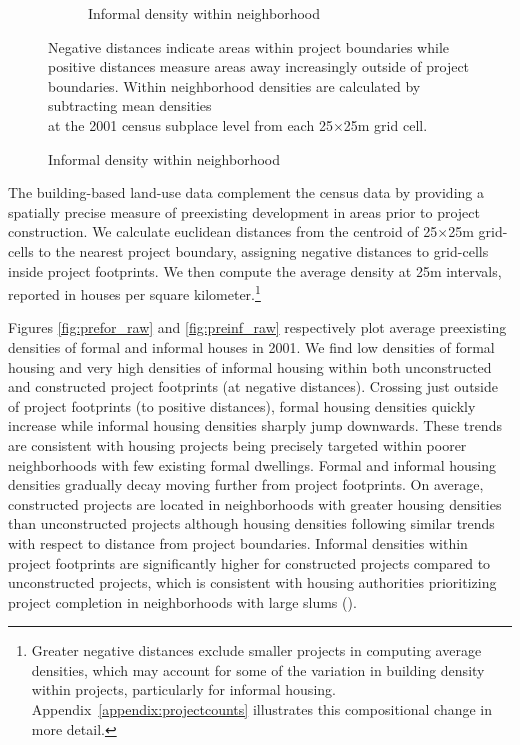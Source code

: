\documentclass[12pt]{article}
\begin{document}
\begin{figure}[h!]
\begin{subfigure}[b]{0.495\textwidth}
            \caption[]%
            {{\small Informal density within neighborhood}}    
            \label{fig:preinf_fe}
        \end{subfigure}
        \label{fig:rawbblumeans_het}
   {\scriptsize Negative distances indicate areas within project boundaries while positive distances measure areas away increasingly outside of project boundaries.  Within neighborhood densities are calculated by subtracting mean densities  \\[-.5em] at the 2001 census subplace level from each 25$\times$25m grid cell.}
    \end{figure} 


The building-based land-use data complement the census data by providing a spatially precise measure of preexisting development in areas prior to project construction.  We calculate euclidean distances from the centroid of 25$\times$25m grid-cells to the nearest project boundary, assigning negative distances to grid-cells inside project footprints.  We then compute the average density at 25m intervals, reported in houses per square kilometer.\footnote{Greater negative distances exclude smaller projects in computing average densities, which may account for some of the variation in building density within projects, particularly for informal housing.  Appendix~\ref{appendix:projectcounts} illustrates this compositional change in more detail.} 

Figures \ref{fig:prefor_raw} and \ref{fig:preinf_raw} respectively plot average preexisting densities of formal and informal houses in 2001. We find low densities of formal housing and very high densities of informal housing within both unconstructed and constructed project footprints (at negative distances).  Crossing just outside of project footprints (to positive distances), formal housing densities quickly increase while informal housing densities sharply jump downwards.  These trends are consistent with housing projects being precisely targeted within poorer neighborhoods with few existing formal dwellings.  Formal and informal housing densities gradually decay moving further from project footprints.  On average, constructed projects are located in neighborhoods with greater housing densities than unconstructed projects although housing densities following similar trends with respect to distance from project boundaries.  Informal densities within project footprints are significantly higher for constructed projects compared to unconstructed projects, which is consistent with housing authorities prioritizing project completion in neighborhoods with large slums (\cite{hofmeyr2008risk}).  
\end{document}
